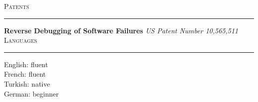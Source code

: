 \documentclass[10pt]{article}
\newcommand{\mysec}[1]{\vspace{2em}\textsc{\large #1}\vspace{1mm}\hrule\vspace{2mm}}
\newcommand{\mysub}[3]{\textbf{#1} {#2} \hfill {\em #3}}
\newcommand{\myssub}[1]{\hspace*{2mm}\parbox{163mm}{#1}\vspace*{2mm}}
\begin{document}




\mysec{Patents}
\mysub{Reverse Debugging of Software Failures}{}{\rm US Patent Number 10,565,511\vspace{2mm}} \\

\mysec{Languages}


\myssub{English: fluent \\
French: fluent \\
Turkish: native \\
German: beginner}\\


\end{document}
